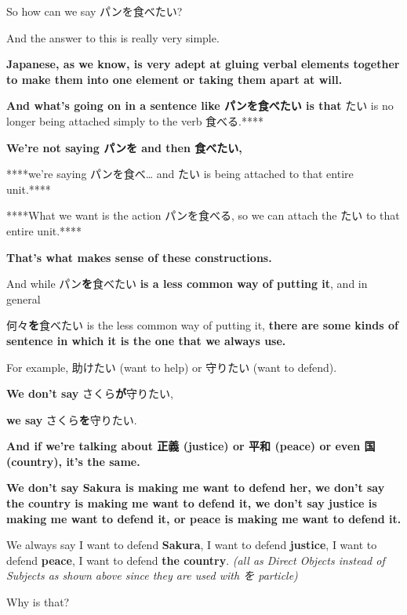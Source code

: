 So how can we say パンを食べたい?

And the answer to this is really very simple.

{\bf Japanese, as we know, is very adept at gluing verbal elements together to make them into one element or taking them apart at will.}

{}

{\bf And what's going on in a sentence like パンを食べたい is that\crlf
}たい is no longer being attached simply to the verb 食べる.****

\thinrule

{\bf We're not saying パンを and then 食べたい,}

****we're saying パンを食べ\ldots{} and たい is being attached to that entire unit.****

****What we want is the action パンを食べる, so we can attach the たい to that entire unit.****

{\bf That's what makes sense of these constructions.}

\thinrule

And while パン{\bf を}食べたい {\bf is a less common way of putting it}, and in general

何々{\bf を}食べたい is the less common way of putting it,\crlf
{\bf there are some kinds of sentence in which it is the one that we always use.}

{}

For example, 助けたい (want to help) or 守りたい (want to defend).

{\bf We don't say} さくら{\bf が}守りたい,

{\bf we say} さくら{\bf を}守りたい.

{\bf And if we're talking about 正義 (justice) or 平和 (peace) or even 国 (country), it's the same.}

{}

{\bf We don't say Sakura is making me want to defend her, we don't say the country is making me want to defend it, we don't say justice is making me want to defend it, or peace is making me want to defend it.}

We always say I want to defend {\bf Sakura}, I want to defend {\bf justice}, I want to defend {\bf peace}, I want to defend {\bf the country}.\crlf
{\em (all as Direct Objects instead of Subjects as shown above since they are used with を particle)}

Why is that?

